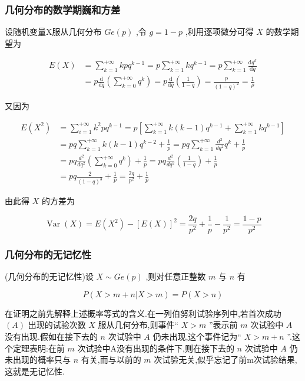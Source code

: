 \subsubsection{几何分布的数学期巍和方差}

设随机变量X服从几何分布 $ Ge(p) $ ,令 $ g=1-p $ ,利用逐项微分可得 $ X $ 的数学期望为

\[
\begin{aligned} E(X) &=\sum_{k=1}^{+\infty} k p q^{k-1} =p \sum_{k=1}^{+\infty} k q^{k-1}=p \sum_{k=1}^{+\infty} \frac{\mathrm{d} q^{k}}{\mathrm{d} q} \\ &=p \frac{\mathrm{d}}{\mathrm{d} q}\left(\sum_{k=0}^{+\infty} q^{k}\right)=p \frac{\mathrm{d}}{\mathrm{d} q}\left(\frac{1}{1-q}\right)=\frac{p}{(1-q)^{2}}=\frac{1}{\rho} \end{aligned}
\]

又因为

\[
\begin{aligned} 
E\left(X^{2}\right) &=\sum_{i=1}^{+\infty} k^{2} p q^{k-1}=p\left[\sum_{k=1}^{+\infty} k(k-1) q^{k-1}+\sum_{k=1}^{+\infty} k q^{k-1}\right] \\ 
&=p q \sum_{k=1}^{+\infty} k(k-1) q^{k-2}+\frac{1}{p}=p q \sum_{k=1}^{+\infty} \frac{d^{2}}{d q^{2}} q^{k}+\frac{1}{p}\\
&  {=p q \frac{d^{2}}{d q^{2}}\left(\sum_{k=0}^{+\infty} q^{k}\right)+\frac{1}{p}=p q \frac{d^{2}}{d q^{2}}\left(\frac{1}{1-q}\right)+\frac{1}{p}}\\
& {=p q \frac{2}{(1-q)^{3}}+\frac{1}{p}=\frac{2 q}{p^{2}}+\frac{1}{p}}
\end{aligned}
\]

由此得 $ X $ 的方差为

\[
\operatorname{Var}(X)=E\left(X^{2}\right)-[E(X)]^{2}=\frac{2 q}{p^{2}}+\frac{1}{p}-\frac{1}{p^{2}}=\frac{1-p}{p^{2}}
\]


\subsubsection{几何分布的无记忆性}

\begin{theorem}
	(几何分布的无记忆性)设 $ X \sim G e(p) $ ,则对任意正整数 $ m $ 与 $ n $ 有
	
	\begin{equation}
	P(X>m+n | X>m)=P(X>n) \label{eq:2.4.9}
	\end{equation}
\end{theorem}

在证明之前先解释上述概率等式的含义.在一列伯努利试验序列中,若首次成功 $ (A) $ 出现的试验次数 $ X $ 服从几何分布,则事件“ $ X>m $ ”表示前 $ m $ 次试验中 $ A $ 没有出现.假如在接下去的 $ n $ 次试验中 $ A $ 仍未出现,这个事件记为“ $ X>m+n $ ”.这个定理表明:在前 $ m $ 次试验中A没有出现的条件下,则在接下去的 $ n $ 次试验中 $ A $ 仍未出现的概率只与 $ n $ 有关,而与以前的 $ m $ 次试验无关,似乎忘记了前m次试验结果,这就是无记忆性.


